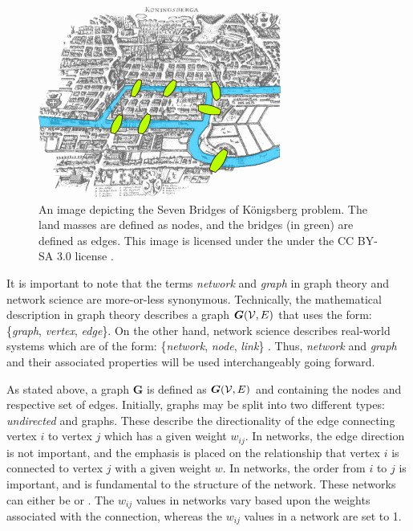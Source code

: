 \begin{figure}[t]
    \centering
    \includegraphics[scale = 0.75]{figure/background/Konigsberg_bridges.png}
    \caption[An image depicting the Seven Bridges of Königsberg problem. The land masses are defined as  nodes, and the bridges (in green) are defined as edges.]{An image depicting the Seven Bridges of Königsberg problem. The land masses are defined as  nodes, and the bridges (in green) are defined as edges. This image is licensed under the under the CC BY-SA 3.0 license \citep{Giusca2005}.}
    \label{fig:konigsberg}
\end{figure}

It is important to note that the terms \textit{network} and \textit{graph} in graph theory and network science are more-or-less synonymous. Technically, the mathematical description in graph theory describes a graph $\bm{G}(\mathcal{V},E)$ that uses the form: \{\textit{graph}, \textit{vertex}, \textit{edge}\}. On the other hand, network science describes real-world systems which are of the form: \{\textit{network}, \textit{node}, \textit{link}\} \citep{Barabasi2016}. Thus, \textit{network} and \textit{graph} and their associated properties will be used interchangeably going forward. 

As stated above, a graph $\bm{G}$ is defined as $\bm{G}(\mathcal{V},E)$ and containing the nodes and respective set of edges. Initially, graphs may be split into two different types: \textit{undirected} and  graphs. These describe the directionality of the edge connecting vertex $i$ to vertex $j$ which has a given weight $w_{ij}$. In  networks, the edge direction is not important, and the emphasis is placed on the relationship that vertex $i$ is connected to vertex $j$ with a given weight $w$. In  networks, the order from $i$ to $j$ is important, and is fundamental to the structure of the network. These networks can either be  or . The $w_{ij}$ values in  networks vary based upon the weights associated with the connection, whereas the $w_{ij}$ values in a  network are set to 1. 

